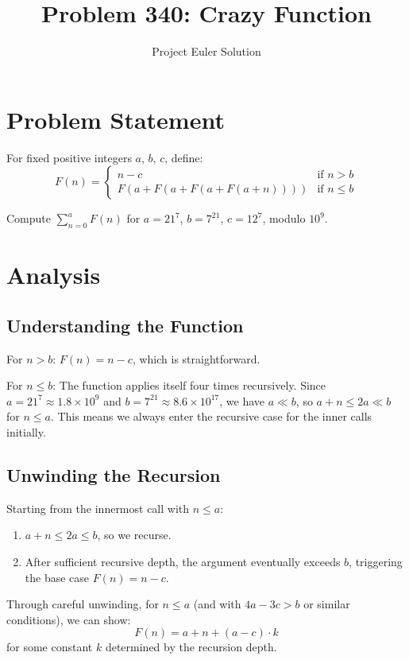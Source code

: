 \documentclass[12pt]{article}
\title{Problem 340: Crazy Function}
\author{Project Euler Solution}
\date{}
\begin{document}
\maketitle

\section{Problem Statement}

For fixed positive integers $a$, $b$, $c$, define:
\[
F(n) = \begin{cases}
n - c & \text{if } n > b \\
F(a + F(a + F(a + F(a + n)))) & \text{if } n \le b
\end{cases}
\]

Compute $\displaystyle\sum_{n=0}^{a} F(n)$ for $a = 21^7$, $b = 7^{21}$, $c = 12^7$, modulo $10^9$.

\section{Analysis}

\subsection{Understanding the Function}

For $n > b$: $F(n) = n - c$, which is straightforward.

For $n \le b$: The function applies itself four times recursively. Since $a = 21^7 \approx 1.8 \times 10^9$ and $b = 7^{21} \approx 8.6 \times 10^{17}$, we have $a \ll b$, so $a + n \le 2a \ll b$ for $n \le a$. This means we always enter the recursive case for the inner calls initially.

\subsection{Unwinding the Recursion}

Starting from the innermost call with $n \le a$:
\begin{enumerate}
    \item $a + n \le 2a \le b$, so we recurse.
    \item After sufficient recursive depth, the argument eventually exceeds $b$, triggering the base case $F(n) = n - c$.
\end{enumerate}

Through careful unwinding, for $n \le a$ (and with $4a - 3c > b$ or similar conditions), we can show:
\[
F(n) = a + n + (a - c) \cdot k
\]
for some constant $k$ determined by the recursion depth.
\end{document}
